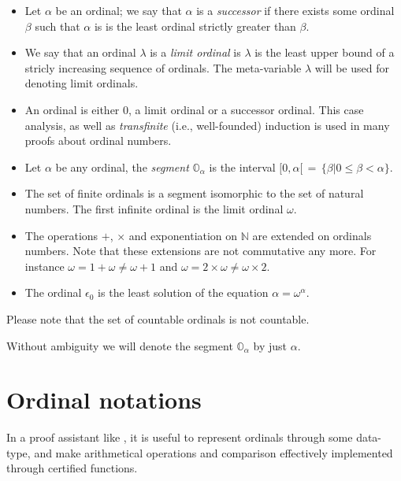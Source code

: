 \begin{itemize}
\item Let  $\alpha$ be an ordinal; we say that  $\alpha$ is a \emph{successor} if there exists some ordinal  $\beta$ such that 
$\alpha$ is is the least ordinal strictly greater than  $\beta$.

\item We say that an ordinal $\lambda$ is a \emph{limit ordinal} is $\lambda$  is the least upper bound of a stricly increasing sequence of ordinals.
The meta-variable $\lambda$ will be used for denoting  limit ordinals.

\item {}
An ordinal is either $0$, a limit ordinal or a successor ordinal. This case analysis, as well as \emph{transfinite} ({i.e.}, well-founded) induction is used in many proofs about ordinal numbers.

\item Let $\alpha$ be any ordinal, the \emph{segment} $\mathbb{O}_\alpha$ is the
interval $[0,\alpha[\,=\,\{\beta|0\leq\beta<\alpha\}$. 

\item The set  of finite ordinals is a segment isomorphic to the set of natural numbers.
 The first infinite ordinal is the limit ordinal $\omega$.
 
\item The operations $+$, $\times$ and exponentiation on $\mathbb{N}$ are extended on ordinals numbers. Note that these  extensions are not commutative any more.  For instance $\omega = 1 + \omega \not= \omega + 1$
and $\omega = 2 \times \omega \not= \omega \times 2$.

\item The ordinal $\epsilon_0$ is the least solution of the equation
 \(\alpha=\omega^{\alpha}\).
\end{itemize}


Please note that the set of countable ordinals is not countable. 

Without ambiguity we will denote the segment $\mathbb{O}_\alpha$ by just $\alpha$.
 


\section{Ordinal notations}
In a proof assistant like \coq{},  it is useful to represent ordinals through some data-type, and make arithmetical operations and comparison effectively implemented  through certified functions.

